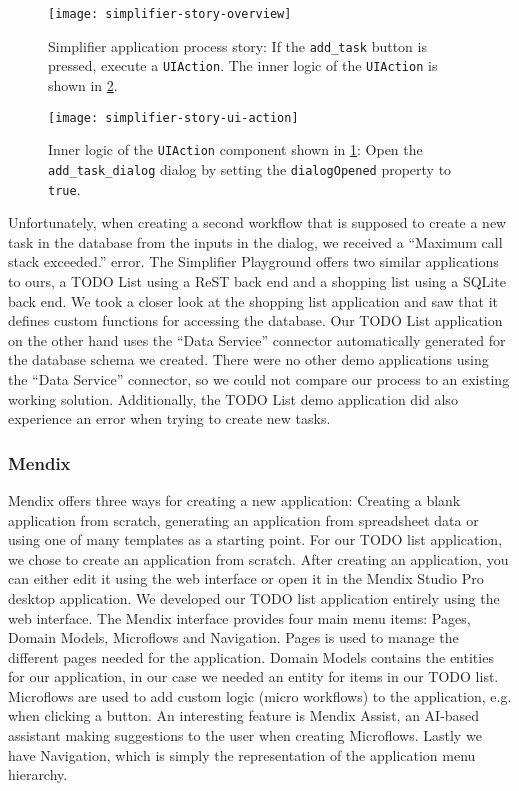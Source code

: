 \documentclass[runningheads]{llncs}
\begin{document}
\begin{figure}
  \centering
  \texttt{[image: simplifier-story-overview]}
  \caption{Simplifier application process story: If the \texttt{add\_task} button is pressed, execute a \texttt{UIAction}. The inner logic of the \texttt{UIAction} is shown in \cref{fig:simplifier_story_ui_action}.}
  \label{fig:simplifier_story_overview}
\end{figure}

\begin{figure}
  \centering
  \texttt{[image: simplifier-story-ui-action]}
  \caption{Inner logic of the \texttt{UIAction} component shown in \cref{fig:simplifier_story_overview}: Open the \texttt{add\_task\_dialog} dialog by setting the \texttt{dialogOpened} property to \texttt{true}.}
  \label{fig:simplifier_story_ui_action}
\end{figure}

Unfortunately, when creating a second workflow that is supposed to create a new task in the database from the inputs in the dialog, we received a “Maximum call stack exceeded.” error. The Simplifier Playground offers two similar applications to ours, a TODO List using a ReST back end and a shopping list using a SQLite back end. We took a closer look at the shopping list application and saw that it defines custom functions for accessing the database. Our TODO List application on the other hand uses the “Data Service” connector automatically generated for the database schema we created. There were no other demo applications using the “Data Service” connector, so we could not compare our process to an existing working solution. Additionally, the TODO List demo application did also experience an error when trying to create new tasks.

\subsubsection{Mendix}

Mendix offers three ways for creating a new application: Creating a blank application from scratch, generating an application from spreadsheet data or using one of many templates as a starting point. For our TODO list application, we chose to create an application from scratch. After creating an application, you can either edit it using the web interface or open it in the Mendix Studio Pro desktop application. We developed our TODO list application entirely using the web interface. The Mendix interface provides four main menu items: Pages, Domain Models, Microflows and Navigation. Pages is used to manage the different pages needed for the application. Domain Models contains the entities for our application, in our case we needed an entity for items in our TODO list. Microflows are used to add custom logic (micro workflows) to the application, e.g. when clicking a button. An interesting feature is Mendix Assist, an AI-based assistant making suggestions to the user when creating Microflows. Lastly we have Navigation, which is simply the representation of the application menu hierarchy.
\end{document}
